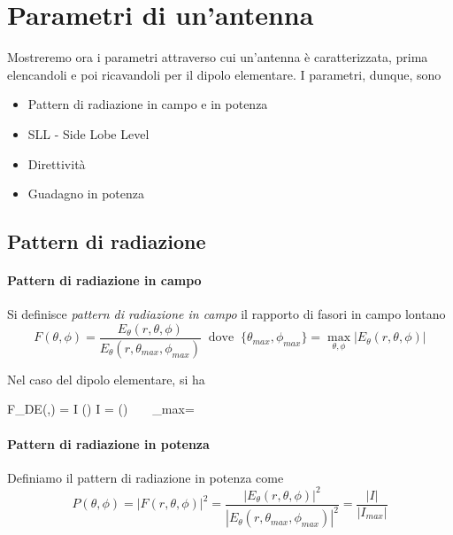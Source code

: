 \section{Parametri di un'antenna}\label{sec:paramAnt}
Mostreremo ora i parametri attraverso cui un'antenna è caratterizzata, prima elencandoli e poi ricavandoli per il dipolo elementare.
I parametri, dunque, sono
\begin{itemize}
	\item Pattern di radiazione in campo e in potenza
	\item SLL - Side Lobe Level
	\item Direttività
	\item Guadagno in potenza
\end{itemize}

\subsection{Pattern di radiazione}
\paragraph{Pattern di radiazione in campo}
Si definisce \emph{pattern di radiazione in campo} il rapporto di fasori in campo lontano
\begin{equation} \label{eq:patternCampo}
	F(\theta,\phi) = \frac{E_\theta(r,\theta,\phi)}{E_\theta(r,\theta_{max},\phi_{max})}
	~ \text{ dove } ~
	\{\theta_{max} , \phi_{max}\} = \max_{\theta,\phi} |E_\theta(r,\theta,\phi)|
\end{equation}

Nel caso del dipolo elementare, si ha
\begin{esp*}
	F_{DE}(\theta,\phi)
	= \frac
		{\jmath\eta I   \sin(\theta)}
		{\jmath\eta I  }
	= \sin(\theta)
	~ \implies ~ \theta_{max}=
\end{esp*}


\paragraph{Pattern di radiazione in potenza}
Definiamo il pattern di radiazione in potenza come
\begin{equation}\label{eq:patternPotenza}
	P(\theta,\phi)
	= |F(r,\theta,\phi)|^2
	= \frac
		{|E_\theta(r,\theta,\phi)|^2}
		{|E_\theta(r,\theta_{max},\phi_{max})|^2}
	= \frac{|I|}{|I_{max}|}
\end{equation}

